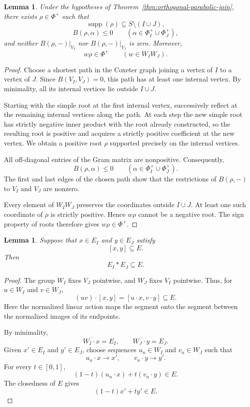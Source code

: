 \documentclass[11pt,reqno]{amsart}
\theoremstyle{plain}
\newtheorem{lemma}[theorem]{Lemma}
\theoremstyle{definition}
\theoremstyle{remark}
\numberwithin{equation}{section}
\begin{document}
\begin{lemma}\label{lem:connecting-root}
Under the hypotheses of Theorem~\ref{thm:orthogonal-parabolic-join},
there exists $\rho\in\Phi^+$ such that
\[
\operatorname{supp}(\rho)\subseteq S\setminus(I\cup J),
\]
\[
B(\rho,\alpha)\le0
\qquad
(\alpha\in\Phi_I^+\cup\Phi_J^+),
\]
and neither $B(\rho,-)|_{V_I}$ nor $B(\rho,-)|_{V_J}$ is zero.
Moreover,
\[
w\rho\in\Phi^+
\qquad (w\in W_IW_J).
\]
\end{lemma}

\begin{proof}
Choose a shortest path in the Coxeter graph joining a vertex of
$I$ to a vertex of $J$. Since $B(V_I,V_J)=0$, this path has at least
one internal vertex. By minimality, all its internal vertices lie
outside $I\cup J$.

Starting with the simple root at the first internal vertex,
successively reflect at the remaining internal vertices along
the path. At each step the new simple root has strictly negative
inner product with the root already constructed, so the resulting
root is positive and acquires a strictly positive coefficient at
the new vertex. We obtain a positive root $\rho$ supported
precisely on the internal vertices.

All off-diagonal entries of the Gram matrix are nonpositive.
Consequently,
\[
B(\rho,\alpha)\le0
\qquad
(\alpha\in\Phi_I^+\cup\Phi_J^+).
\]
The first and last edges of the chosen path show that the
restrictions of $B(\rho,-)$ to $V_I$ and $V_J$ are nonzero.

Every element of $W_IW_J$ preserves the coordinates outside
$I\cup J$. At least one such coordinate of $\rho$ is strictly
positive. Hence $w\rho$ cannot be a negative root. The sign
property of roots therefore gives $w\rho\in\Phi^+$.
\end{proof}

\begin{lemma}\label{lem:one-segment-suffices}
Suppose that $x\in E_I$ and $y\in E_J$ satisfy
\[
[x,y]\subseteq E.
\]
Then
\[
E_I*E_J\subseteq E.
\]
\end{lemma}

\begin{proof}
The group $W_I$ fixes $V_J$ pointwise, and $W_J$ fixes $V_I$
pointwise. Thus, for $u\in W_I$ and $v\in W_J$,
\[
(uv)\cdot[x,y]=[u\cdot x,v\cdot y]\subseteq E.
\]
Here the normalized linear action maps the segment onto the
segment between the normalized images of its endpoints.

By minimality,
\[
\overline{W_I\cdot x}=E_I,
\qquad
\overline{W_J\cdot y}=E_J.
\]
Given $x'\in E_I$ and $y'\in E_J$, choose sequences
$u_n\in W_I$ and $v_n\in W_J$ such that
\[
u_n\cdot x\longrightarrow x',
\qquad
v_n\cdot y\longrightarrow y'.
\]
For every $t\in[0,1]$,
\[
(1-t)(u_n\cdot x)+t(v_n\cdot y)\in E.
\]
The closedness of $E$ gives
\[
(1-t)x'+ty'\in E.
\]
\end{proof}
\end{document}
